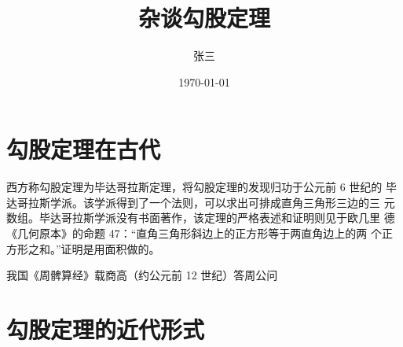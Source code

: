 \documentclass[UTF8]{ctexart}
\title{杂谈勾股定理}
\author{张三}
\date{\today}
\begin{document}
\maketitle
\tableofcontents
\section{勾股定理在古代}
西方称勾股定理为毕达哥拉斯定理，将勾股定理的发现归功于公元前 6 世纪的
毕达哥拉斯学派。该学派得到了一个法则，可以求出可排成直角三角形三边的三
元数组。毕达哥拉斯学派没有书面著作，该定理的严格表述和证明则见于欧几里
德《几何原本》的命题 47：“直角三角形斜边上的正方形等于两直角边上的两
个正方形之和。”证明是用面积做的。

我国《周髀算经》载商高（约公元前 12 世纪）答周公问
\section{勾股定理的近代形式}

\end{document}
